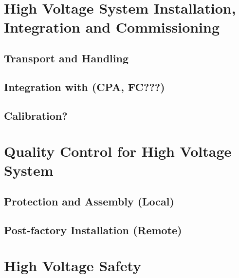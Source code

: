 \section{High Voltage System Installation, Integration and Commissioning}
\label{sec:fdsp-hv-install}

\subsection{Transport and Handling}
\label{sec:fdsp-hv-install-transport}


\subsection{Integration with (CPA, FC???)}
\label{sec:fdsp-hv-install-pds-elec}


\subsection{Calibration?}
\label{sec:fdsp-hv-install-calib}



\section{Quality Control for High Voltage System}
\label{sec:fdsp-hv-qc}

\subsection{Protection and Assembly (Local)}
\label{sec:fdsp-hv-qc-local}


\subsection{Post-factory Installation (Remote)}
\label{sec:fdsp-hv-qc-remote}





\section{High Voltage Safety}
\label{sec:fdsp-hv-safety}

